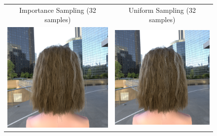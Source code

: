 \documentclass[11pt,a4paper]{report}
\begin{document}
\begin{figure}[h]
\begin{tabular}{cc}
Importance Sampling (32 samples) & Uniform Sampling (32 samples) \\
\includegraphics[scale=0.16]{realworld/officesquare/deon_blonde1_32.png} &
\includegraphics[scale=0.16]{realworld/officesquare/uniform_blonde1_32.png} \\

\end{tabular}
\end{figure}
\end{document}
